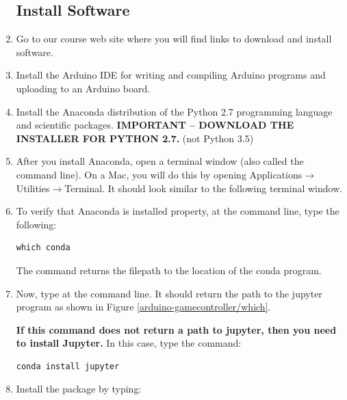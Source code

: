 \begin{enumerate}

\subsection*{Install Software}

\item Go to our course web site where you will find links to download and install software.

\item Install the Arduino IDE for writing and compiling Arduino programs and uploading to an Arduino board.

\item Install the Anaconda distribution of the Python 2.7 programming language and scientific packages. {\bf IMPORTANT -- DOWNLOAD THE INSTALLER FOR PYTHON 2.7.} (not Python 3.5)

\item After you install Anaconda, open a terminal window (also called the command line). On a Mac, you will do this by opening Applications$\to$Utilities$\to$Terminal. It should look similar to the following terminal window.


\item To verify that Anaconda is installed property, at the command line, type the following:

\begin{verbatim}
which conda
\end{verbatim}

The command  returns the filepath to the location of the conda program.

\item Now, type  at the command line. It should return the path to the jupyter program as shown in Figure \ref{arduino-gamecontroller/which}.



{\bf If this command does not return a path to jupyter, then you need to install Jupyter.}  In this case, type the command:

\begin{verbatim}
conda install jupyter
\end{verbatim}

\item Install the  package by typing:


\end{enumerate}
